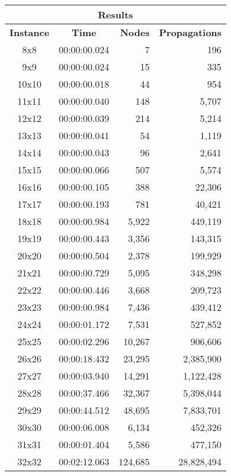 
\begin{center}
    \begin{tabular}{|c|c|r|r|}
        \hline
        \multicolumn{4}{|c|}{\textbf{Results}} \\
        \hline
        \textbf{Instance} & \textbf{Time} & \textbf{Nodes} & \textbf{Propagations} \\
        
        \hline
		8x8 & 00:00:00.024 & 7 & 196 \\ \hline
		9x9 & 00:00:00.024 & 15 & 335 \\ \hline
		10x10 & 00:00:00.018 & 44 & 954 \\ \hline
		11x11 & 00:00:00.040 & 148 & 5,707 \\ \hline
		12x12 & 00:00:00.039 & 214 & 5,214 \\ \hline
		13x13 & 00:00:00.041 & 54 & 1,119 \\ \hline
		14x14 & 00:00:00.043 & 96 & 2,641 \\ \hline
		15x15 & 00:00:00.066 & 507 & 5,574 \\ \hline
		16x16 & 00:00:00.105 & 388 & 22,306 \\ \hline
		17x17 & 00:00:00.193 & 781 & 40,421 \\ \hline
		18x18 & 00:00:00.984 & 5,922 & 449,119 \\ \hline
		19x19 & 00:00:00.443 & 3,356 & 143,315 \\ \hline
		20x20 & 00:00:00.504 & 2,378 & 199,929 \\ \hline
		21x21 & 00:00:00.729 & 5,095 & 348,298 \\ \hline
		22x22 & 00:00:00.446 & 3,668 & 209,723 \\ \hline
		23x23 & 00:00:00.984 & 7,436 & 439,412 \\ \hline
		24x24 & 00:00:01.172 & 7,531 & 527,852 \\ \hline
		25x25 & 00:00:02.296 & 10,267 & 906,606 \\ \hline
		26x26 & 00:00:18.432 & 23,295 & 2,385,900 \\ \hline
		27x27 & 00:00:03.940 & 14,291 & 1,122,428 \\ \hline
		28x28 & 00:00:37.466 & 32,367 & 5,398,044 \\ \hline
		29x29 & 00:00:44.512 & 48,695 & 7,833,701 \\ \hline
		30x30 & 00:00:06.008 & 6,134 & 452,326 \\ \hline
		31x31 & 00:00:01.404 & 5,586 & 477,150 \\ \hline
		32x32 & 00:02:12.063 & 124,685 & 28,828,494 \\ \hline

\end{tabular}
\end{center}
